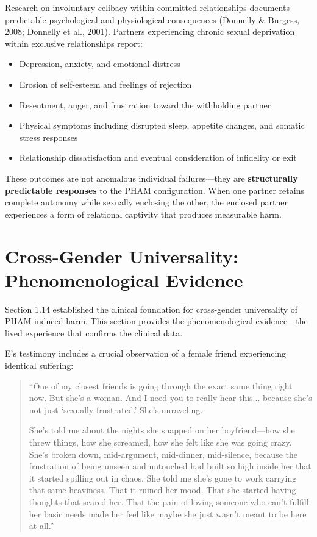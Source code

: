 \documentclass[12pt,openany]{book}
\numberwithin{equation}{chapter}
\begin{document}
Research on involuntary celibacy within committed relationships documents predictable psychological and physiological consequences (Donnelly \& Burgess, 2008; Donnelly et al., 2001). Partners experiencing chronic sexual deprivation within exclusive relationships report:

\begin{itemize}
    \item Depression, anxiety, and emotional distress
    \item Erosion of self-esteem and feelings of rejection
    \item Resentment, anger, and frustration toward the withholding partner
    \item Physical symptoms including disrupted sleep, appetite changes, and somatic stress responses
    \item Relationship dissatisfaction and eventual consideration of infidelity or exit
\end{itemize}

These outcomes are not anomalous individual failures---they are \textbf{structurally predictable responses} to the PHAM configuration. When one partner retains complete autonomy while sexually enclosing the other, the enclosed partner experiences a form of relational captivity that produces measurable harm.

\section{Cross-Gender Universality: Phenomenological Evidence}

Section 1.14 established the clinical foundation for cross-gender universality of PHAM-induced harm. This section provides the phenomenological evidence---the lived experience that confirms the clinical data.

E's testimony includes a crucial observation of a female friend experiencing identical suffering:

\begin{quote}
``One of my closest friends is going through the exact same thing right now. But she's a woman. And I need you to really hear this... because she's not just `sexually frustrated.' She's unraveling.

She's told me about the nights she snapped on her boyfriend---how she threw things, how she screamed, how she felt like she was going crazy. She's broken down, mid-argument, mid-dinner, mid-silence, because the frustration of being unseen and untouched had built so high inside her that it started spilling out in chaos. She told me she's gone to work carrying that same heaviness. That it ruined her mood. That she started having thoughts that scared her. That the pain of loving someone who can't fulfill her basic needs made her feel like maybe she just wasn't meant to be here at all.''
\end{quote}
\end{document}
